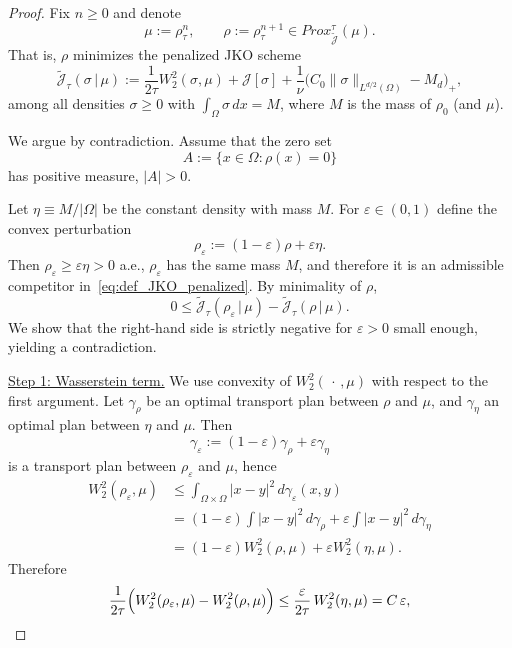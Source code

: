 \documentclass[10pt,a4paper]{amsart}
\begin{document}
\begin{proof}
Fix $n\ge 0$ and denote
\[
\mu:=\rho_\tau^n,
\qquad
\rho:=\rho_\tau^{n+1}\in Prox_{\widetilde{\mathcal J}}^\tau(\mu).
\]
That is, $\rho$ minimizes the penalized JKO scheme
\begin{equation}\label{eq:def_JKO_penalized}
\widetilde{\mathcal J}_\tau(\sigma\,|\,\mu)
:=\frac{1}{2\tau}W_2^2(\sigma,\mu)
+\mathcal J[\sigma]
+\frac1\nu\bigl(C_0\|\sigma\|_{L^{d/2}(\Omega)}-M_d\bigr)_+,
\end{equation}
among all densities $\sigma\ge 0$ with $\int_\Omega \sigma\,dx=M$, where $M$ is the mass of $\rho_0$ (and $\mu$).

We argue by contradiction. Assume that the zero set
\[
A:=\{x\in\Omega:\rho(x)=0\}
\]
has positive measure, $|A|>0$.

Let $\eta\equiv M/|\Omega|$ be the constant density with mass $M$.
For $\varepsilon\in(0,1)$ define the convex perturbation
\[
\rho_\varepsilon:=(1-\varepsilon)\rho+\varepsilon\eta.
\]
Then $\rho_\varepsilon\ge \varepsilon\eta>0$ a.e., $\rho_\varepsilon$ has the same mass $M$, and therefore it is an admissible
competitor in~\eqref{eq:def_JKO_penalized}. By minimality of $\rho$,
\begin{equation}\label{eq:minimality_start}
0\le \widetilde{\mathcal J}_\tau(\rho_\varepsilon\,|\,\mu)-\widetilde{\mathcal J}_\tau(\rho\,|\,\mu).
\end{equation}
We show that the right-hand side is strictly negative for $\varepsilon>0$ small enough, yielding a contradiction.

\medskip
\underline{Step 1: Wasserstein term.}
We use convexity of $W_2^2(\,\cdot\,,\mu)$ with respect to the first argument.
Let $\gamma_\rho$ be an optimal transport plan between $\rho$ and $\mu$, and $\gamma_\eta$ an optimal plan between $\eta$ and $\mu$.
Then
\[
\gamma_\varepsilon:=(1-\varepsilon)\gamma_\rho+\varepsilon\gamma_\eta
\]
is a transport plan between $\rho_\varepsilon$ and $\mu$, hence
\begin{align*}
W_2^2(\rho_\varepsilon,\mu)
&\le \int_{\Omega\times\Omega}|x-y|^2\,d\gamma_\varepsilon(x,y)\\
&=(1-\varepsilon)\int |x-y|^2\,d\gamma_\rho+\varepsilon\int |x-y|^2\,d\gamma_\eta\\
&=(1-\varepsilon)W_2^2(\rho,\mu)+\varepsilon W_2^2(\eta,\mu).
\end{align*}
Therefore
\begin{equation}\label{eq:W2_Oeps}
\frac{1}{2\tau}\Bigl(W_2^2(\rho_\varepsilon,\mu)-W_2^2(\rho,\mu)\Bigr)
\le \frac{\varepsilon}{2\tau}\,W_2^2(\eta,\mu)
=C\,\varepsilon,
\end{equation}



\end{proof}
\end{document}
